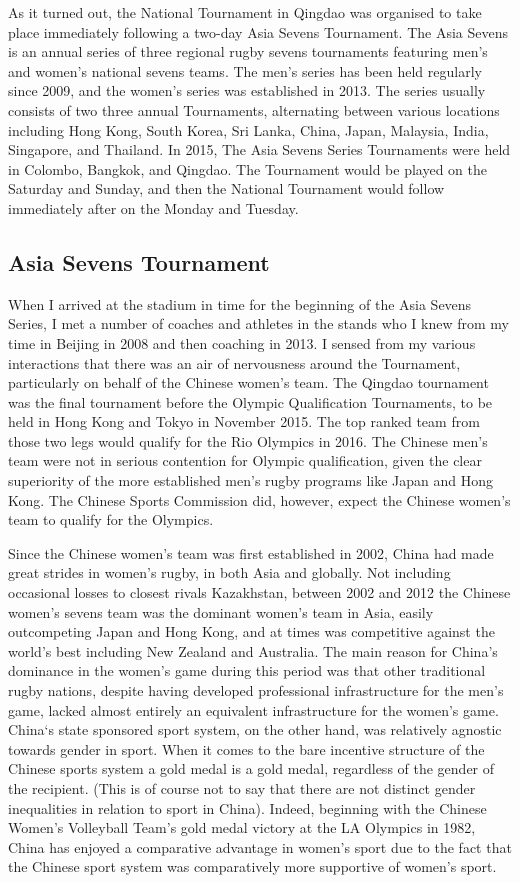 \begin{CJK}{UTF8}{gbsn}
  As it turned out, the National Tournament in Qingdao was organised to take place immediately following a two-day Asia Sevens Tournament.  The Asia Sevens is an annual series of three regional rugby sevens tournaments featuring men's and women's national sevens teams.  The men's series has been held regularly since 2009, and the women's series was established in 2013. The series usually consists of two three annual Tournaments, alternating between various locations including Hong Kong, South Korea, Sri Lanka, China, Japan, Malaysia, India, Singapore, and Thailand.  In 2015, The Asia Sevens Series Tournaments were held in Colombo, Bangkok, and Qingdao. The Tournament would be played on the Saturday and Sunday, and then the National Tournament would follow immediately after on the Monday and Tuesday.

  \subsection{Asia Sevens Tournament}
  When I arrived at the stadium in time for the beginning of the Asia Sevens Series, I met a number of coaches and athletes in the stands who I knew from my time in Beijing in 2008 and then coaching in 2013. I sensed from my various interactions that there was an air of nervousness around the Tournament, particularly on behalf of the Chinese women's team.   The Qingdao tournament was the final tournament before the Olympic Qualification Tournaments, to be held in Hong Kong and Tokyo in November 2015.  The top ranked team from those two legs would qualify for the Rio Olympics in 2016.  The Chinese men's team were not in serious contention for Olympic qualification, given the clear superiority of the more established men's rugby programs like Japan and Hong Kong. The Chinese Sports Commission did, however, expect the Chinese women's team to qualify for the Olympics.

  Since the Chinese women's team was first established in 2002, China had made great strides in women's rugby, in both Asia and globally.  Not including occasional losses to closest rivals Kazakhstan, between 2002 and 2012 the Chinese women's sevens team was the dominant women's team in Asia, easily outcompeting Japan and Hong Kong, and at times was competitive against the world's best including New Zealand and Australia.  The main reason for China's dominance in the women's game during this period was that other traditional rugby nations, despite having developed professional infrastructure for the men's game, lacked almost entirely an equivalent infrastructure for the women's game. China`s state sponsored sport system, on the other hand, was relatively agnostic towards gender in sport. When it comes to the bare incentive structure of the Chinese sports system a gold medal is a gold medal, regardless of the gender of the recipient. (This is of course not to say that there are not distinct gender inequalities in relation to sport in China).  Indeed, beginning with the Chinese Women's Volleyball Team's gold medal victory at the LA Olympics in 1982, China has enjoyed a comparative advantage in women's sport due to the fact that the Chinese sport system was comparatively more supportive of women's sport.


\end{CJK}
